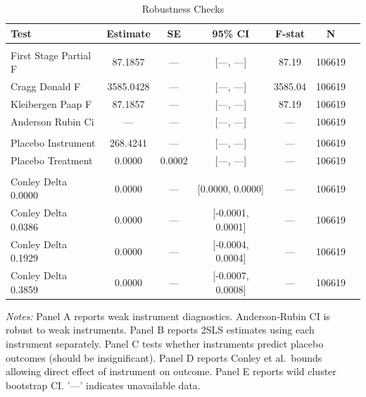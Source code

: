 \begin{table}[htbp]
\centering
\caption{Robustness Checks}
\label{tab:robustness}
\begin{tabular}{l cccccc}
\toprule
Test & Estimate & SE & 95\% CI & F-stat & N \\
\midrule
\addlinespace
\multicolumn{6}{l}{\textit{Panel A: Weak Instrument Diagnostics}} \\
  First Stage Partial F & 87.1857 & --- & [---, ---] & 87.19 & 106619 \\
  Cragg Donald F & 3585.0428 & --- & [---, ---] & 3585.04 & 106619 \\
  Kleibergen Paap F & 87.1857 & --- & [---, ---] & 87.19 & 106619 \\
  Anderson Rubin Ci & --- & --- & [---, ---] & --- & 106619 \\
\addlinespace
\multicolumn{6}{l}{\textit{Panel C: Placebo Tests}} \\
  Placebo Instrument & 268.4241 & --- & [---, ---] & --- & 106619 \\
  Placebo Treatment & 0.0000 & 0.0002 & [---, ---] & --- & 106619 \\
\addlinespace
\multicolumn{6}{l}{\textit{Panel D: Exclusion Restriction Sensitivity}} \\
  Conley Delta 0.0000 & 0.0000 & --- & [0.0000, 0.0000] & --- & 106619 \\
  Conley Delta 0.0386 & 0.0000 & --- & [-0.0001, 0.0001] & --- & 106619 \\
  Conley Delta 0.1929 & 0.0000 & --- & [-0.0004, 0.0004] & --- & 106619 \\
  Conley Delta 0.3859 & 0.0000 & --- & [-0.0007, 0.0008] & --- & 106619 \\
\bottomrule
\end{tabular}
\begin{tablenotes}
\small
\item \textit{Notes:} Panel A reports weak instrument diagnostics. Anderson-Rubin CI is robust to weak instruments. Panel B reports 2SLS estimates using each instrument separately. Panel C tests whether instruments predict placebo outcomes (should be insignificant). Panel D reports Conley et al.\ bounds allowing direct effect of instrument on outcome. Panel E reports wild cluster bootstrap CI. '---' indicates unavailable data.
\end{tablenotes}
\end{table}